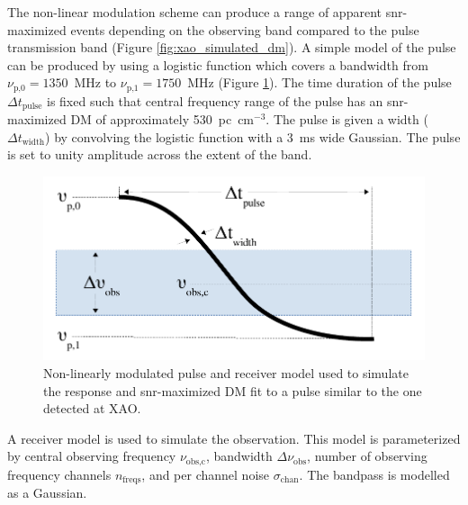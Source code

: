 \documentclass[a4paper,fleqn,usenatbib]{mnras}
\begin{document}
The non-linear modulation scheme can produce a range of apparent
\gls{snr}-maximized events depending on the observing band compared to the pulse
transmission band (Figure \ref{fig:xao_simulated_dm}). A simple model of the
pulse can be produced by using a logistic function which covers a bandwidth from
$\nu_{\textrm{p,0}} = 1350$~MHz to $\nu_{\textrm{p,1}} = 1750$~MHz (Figure
\ref{fig:xao_simulation_diagram}). The time duration of the pulse $\Delta
t_{\textrm{pulse}}$ is fixed such that central frequency range of the pulse has
an \gls{snr}-maximized DM of approximately 530~pc~cm$^{-3}$. The pulse is given
a width ($\Delta t_{\textrm{width}}$) by convolving the logistic function with a
3~ms wide Gaussian. The pulse is set to unity amplitude across the extent of the
band.

\begin{figure}
    \includegraphics[width=1.0\linewidth]{figures/simulation_diagram.pdf}
    \caption{Non-linearly modulated pulse and receiver model used to simulate
    the response and \gls{snr}-maximized DM fit to a pulse similar to the one detected
    at XAO.
    }
    \label{fig:xao_simulation_diagram}
\end{figure}

A receiver model is used to simulate the observation. This model is
parameterized by central observing frequency $\nu_{\textrm{obs,c}}$, bandwidth
$\Delta \nu_{\textrm{obs}}$, number of observing frequency channels
$n_{\textrm{freqs}}$, and per channel noise $\sigma_{\textrm{chan}}$. The
bandpass is modelled as a Gaussian.
\end{document}

